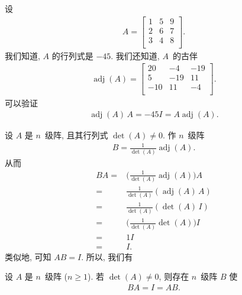 \begin{example}
    设
    \begin{align*}
        A =
        \begin{bmatrix}
            1 & 5 & 9 \\
            2 & 6 & 7 \\
            3 & 4 & 8 \\
        \end{bmatrix}.
    \end{align*}
    我们知道, \(A\) 的行列式是 \(-45\).
    我们还知道, \(A\)~的古伴
    \begin{align*}
        \operatorname{adj} {(A)} =
        \begin{bmatrix}
            20  & -4  & -19 \\
            5   & -19 & 11  \\
            -10 & 11  & -4  \\
        \end{bmatrix}.
    \end{align*}
    可以验证
    \begin{align*}
        \operatorname{adj} {(A)}\, A
        = -45I
        = A\operatorname{adj} {(A)}.
    \end{align*}
\end{example}

设 \(A\) 是 \(n\)~级阵,
且其行列式 \(\det {(A)} \neq 0\).
作 \(n\)~级阵
\begin{align*}
    B = \frac{1}{\det {(A)}} \operatorname{adj} {(A)}.
\end{align*}
从而
\begin{align*}
    BA
    = {} & \Big( \frac{1}{\det {(A)}}
    \operatorname{adj} {(A)} \Big) A
    \\
    = {} & \frac{1}{\det {(A)}} (\operatorname{adj} {(A)}\, A)
    \\
    = {} & \frac{1}{\det {(A)}} (\det {(A)}\, I)
    \\
    = {} & \Big( \frac{1}{\det {(A)}} \det {(A)} \Big) I
    \\
    = {} & 1I
    \\
    = {} & I.
\end{align*}
类似地, 可知 \(AB = I\).
所以, 我们有

\begin{theorem}
    设 \(A\) 是 \(n\)~级阵 (\(n \geq 1\)).
    若 \(\det {(A)} \neq 0\),
    则存在 \(n\)~级阵 \(B\) 使
    \begin{align*}
        BA = I = AB.
    \end{align*}
\end{theorem}

